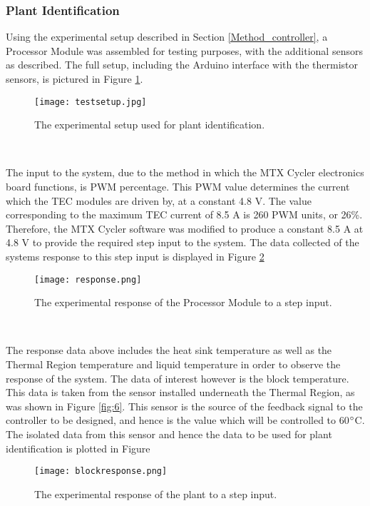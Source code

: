 \subsubsection{Plant Identification}

Using the experimental setup described in Section \ref{Method_controller}, a Processor Module was assembled for testing purposes, with the additional sensors as described. The full setup, including the Arduino interface with the thermistor sensors, is pictured in Figure \ref{fig:plantidentification]}.

\begin{figure}[!htb]
	\centering
	\texttt{[image: testsetup.jpg]}
	\caption[Plant Identification Setup.]{The experimental setup used for plant identification.}
	\label{fig:plantidentification]}
\end{figure} 
\FloatBarrier

The input to the system, due to the method in which the MTX Cycler electronics board functions, is PWM percentage. This PWM value determines the current which the TEC modules are driven by, at a constant 4.8 V. The value corresponding to the maximum TEC current of 8.5 A is 260 PWM units, or 26\%. Therefore, the MTX Cycler software was modified to produce a constant 8.5 A at 4.8 V to provide the required step input to the system. The data collected of the systems response to this step input is displayed in Figure \ref{fig:response]}

\begin{figure}[!htb]
	\centering
	\texttt{[image: response.png]}
	\caption[Full System Response to Step Input.]{The experimental response of the Processor Module to a step input.}
	\label{fig:response]}
\end{figure} 
\FloatBarrier

The response data above includes the heat sink temperature as well as the Thermal Region temperature and liquid temperature in order to observe the response of the system. The data of interest however is the block temperature. This data is taken from the sensor installed underneath the Thermal Region, as was shown in Figure \ref{fig:6}. This sensor is the source of the feedback signal to the controller to be designed, and hence is the value which will be controlled to 60$\degree$C. The isolated data from this sensor and hence the data to be used for plant identification is plotted in Figure 

\begin{figure}[!htb]
	\centering
	\texttt{[image: blockresponse.png]}
	\caption[Plant Response to Step Input.]{The experimental response of the plant to a step input.}
	\label{fig:blockresponse]}
\end{figure} 
\FloatBarrier

